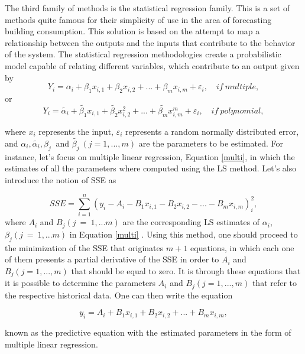 The third family of methods is the statistical regression family. This is a set of methods quite famous for their simplicity of use in the area of forecasting building consumption. This solution is based on the attempt to map a relationship between the outputs and the inputs that contribute to the behavior of the system. The statistical regression methodologies create a probabilistic model capable of relating different variables, which contribute to an output given by 
\begin{equation}
       Y_i = \alpha_i + \beta_1 x_{i,1} + \beta_2 x_{i,2} + ... + \beta_m x_{i,m} + \varepsilon_i,\quad if \  multiple,
\label{multi}
\end{equation}
or
\begin{equation}
       Y_i = \tilde{\alpha_i} + \tilde{\beta_1} x_{i,1} + \tilde{\beta_2} x_{i,2}^2 + ... + \tilde{\beta_m} x_{i,m}^m + \varepsilon_i,\quad if \  polynomial,
\label{poly}
\end{equation}

where $x_i$ represents the input, $\varepsilon_i$ represents a random normally distributed error, and  $\alpha_i, \tilde{\alpha_i}, \beta_j\ $  and  $\tilde{\beta_j}\ (j=1,...,m)$ are the parameters to be estimated. For instance, let's focus on multiple linear regression, Equation \ref{multi}, in which the estimates of all the parameters where computed using the \ac{LS} method. Let's also introduce the notion of \ac{SSE} as

\begin{equation}
       SSE = \sum_{i=1}^n (y_i-A_i-B_1 x_{i,1} - B_2 x_{i,2} - ... - B_m x_{i,m})_i^2,
\label{SSE}
\end{equation}
 where $A_i$ and $B_j(j\ =\ 1,...m)$ are the corresponding \ac{LS} estimates of $\alpha_i$, $\beta_j(j\ =\ 1,...m)$ in Equation \ref{multi} \cite{review2017}. Using this method, one should proceed to the minimization of the SSE that originates $m+1$ equations, in which each one of them presents a partial derivative of the \ac{SSE} in order to $A_i$ and $B_j(j=1,...,m)$ that should be equal to zero. It is through these equations that it is possible to determine the parameters $A_i$ and $B_j(j=1,...,m)$ that refer to the respective historical data. One can then write the equation
 
\begin{equation}
       y_i = A_i + B_1 x_{i,1} +  B_2 x_{i,2} + ... + B_m x_{i,m},
\label{y_i}
\end{equation}

known as the predictive equation with the estimated parameters in the form of multiple linear regression.
 
